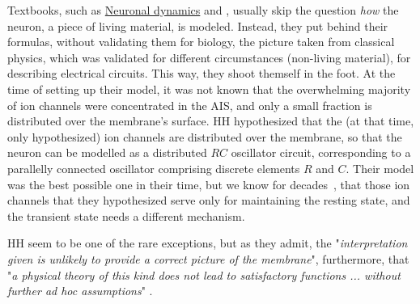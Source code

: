 
Textbooks, such as
\href{https://neuronaldynamics.epfl.ch/}{Neuronal dynamics} and \cite{KochBiophysics:1999},
usually skip the question \textit{how} the neuron, a piece of living material, is modeled.
Instead, they put behind their formulas, without validating them for biology, the picture taken
from classical physics, which was validated for different circumstances (non-living material),
for describing electrical circuits.
This way, they shoot themself in the foot. 
At the time of setting up their model, it was not known that the overwhelming majority of ion channels were concentrated in the \gls{AIS}, and only a small fraction is distributed over the membrane's surface. \gls{HH} hypothesized that the (at that time, only hypothesized) ion channels are distributed over the membrane, so that the neuron can be modelled as a distributed $RC$ oscillator circuit, corresponding to a parallelly connected oscillator comprising discrete elements $R$ and $C$.
Their model was the best possible one in their time, but we know for decades~\cite{ActionPotentialGenerationNatrium:2008,AIS_NeuronalPolarity:2010,BackpropagationAP:2012,AxonInitialSegmentStructure:2018,AIS_Updated_Viewpoint:2018}, that those ion channels that they hypothesized serve only for maintaining the resting state,
and the transient state needs a different mechanism.


\gls{HH}  seem to be one of the rare exceptions, but as they admit, the "\textit{interpretation given is unlikely to provide a correct picture of the
membrane}", furthermore, that "\textit{a physical theory of this kind does not lead to
satisfactory functions ... without further ad hoc assumptions}"  \cite{HodgkinHuxley:1952}.


